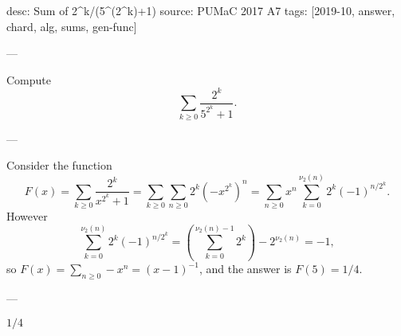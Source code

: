 desc: Sum of 2^k/(5^(2^k)+1)
source: PUMaC 2017 A7
tags: [2019-10, answer, chard, alg, sums, gen-func]

---

Compute \[\sum_{k\ge0}\frac{2^k}{5^{2^k}+1}.\]

---

Consider the function \[F(x)=\sum_{k\ge0}\frac{2^k}{x^{2^k}+1}=\sum_{k\ge0}\sum_{n\ge0}2^k\left(-x^{2^k}\right)^n=\sum_{n\ge0}x^n\sum_{k=0}^{\nu_2(n)}2^k(-1)^{n/2^k}.\]
However \[\sum_{k=0}^{\nu_2(n)}2^k(-1)^{n/2^k}=\left(\sum_{k=0}^{\nu_2(n)-1}2^k\right)-2^{\nu_2(n)}=-1,\]
so $F(x)=\sum_{n\ge0}-x^n=(x-1)^{-1}$, and the answer is $F(5)=1/4$.

---

$1/4$
